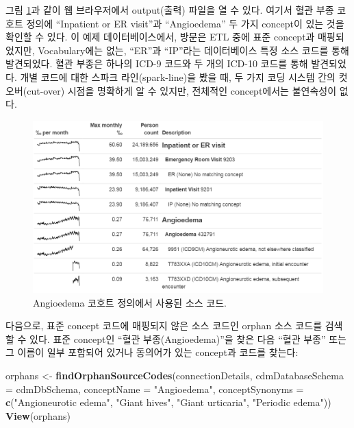 \documentclass[11pt]{book}
\newenvironment{Shaded}{\begin{snugshade}}{\end{snugshade}}
\newcommand{\KeywordTok}[1]{\textcolor[rgb]{0.13,0.29,0.53}{\textbf{#1}}}
\newcommand{\DataTypeTok}[1]{\textcolor[rgb]{0.13,0.29,0.53}{#1}}
\newcommand{\StringTok}[1]{\textcolor[rgb]{0.31,0.60,0.02}{#1}}
\newcommand{\NormalTok}[1]{#1}
\theoremstyle{definition}
\theoremstyle{definition}
\theoremstyle{definition}
\theoremstyle{remark}
\begin{document}
그림 \ref{fig:sourceCodesAngioedema}과 같이 웹 브라우저에서 output(출력)
파일을 열 수 있다. 여기서 혈관 부종 코호트 정의에 ``Inpatient or ER
visit''과 ``Angioedema'' 두 가지 concept이 있는 것을 확인할 수 있다. 이
예제 데이터베이스에서, 방문은 ETL 중에 표준 concept과 매핑되었지만,
Vocabulary에는 없는, ``ER''과 ``IP''라는 데이터베이스 특정 소스 코드를
통해 발견되었다. 혈관 부종은 하나의 ICD-9 코드와 두 개의 ICD-10 코드를
통해 발견되었다. 개별 코드에 대한 스파크 라인(spark-line)을 봤을 때, 두
가지 코딩 시스템 간의 컷 오버(cut-over) 시점을 명확하게 알 수 있지만,
전체적인 concept에서는 불연속성이 없다.

\begin{figure}

{\centering \includegraphics[width=1\linewidth]{images/DataQuality/sourceCodesAngioedema} 

}

\caption{Angioedema 코호트 정의에서 사용된 소스 코드.}\label{fig:sourceCodesAngioedema}
\end{figure}

다음으로, 표준 concept 코드에 매핑되지 않은 소스 코드인 orphan 소스
코드를 검색할 수 있다. 표준 concept인 ``혈관 부종(Angioedema)''을 찾은
다음 ``혈관 부종'' 또는 그 이름이 일부 포함되어 있거나 동의어가 있는
concept과 코드를 찾는다:

\begin{Shaded}
\begin{Highlighting}[]
\NormalTok{orphans <-}\StringTok{ }\KeywordTok{findOrphanSourceCodes}\NormalTok{(connectionDetails,}
                                 \DataTypeTok{cdmDatabaseSchema =}\NormalTok{ cdmDbSchema,}
                                 \DataTypeTok{conceptName =} \StringTok{"Angioedema"}\NormalTok{,}
                                 \DataTypeTok{conceptSynonyms =} \KeywordTok{c}\NormalTok{(}\StringTok{"Angioneurotic edema"}\NormalTok{,}
                                                     \StringTok{"Giant hives"}\NormalTok{,}
                                                     \StringTok{"Giant urticaria"}\NormalTok{,}
                                                     \StringTok{"Periodic edema"}\NormalTok{))}
\KeywordTok{View}\NormalTok{(orphans)}
\end{Highlighting}
\end{Shaded}
\end{document}
